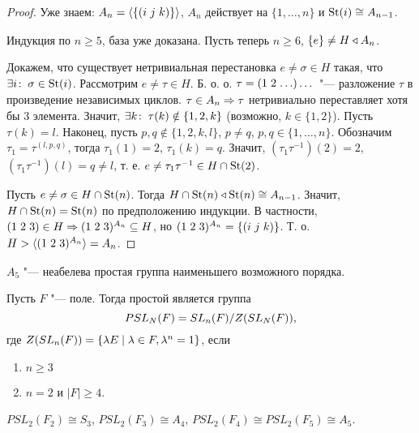 \documentclass[main]{subfiles}
\begin{document}
\begin{proof}
  Уже знаем: \( A_n = \GenGroup{ \{ \Cycle{i & j & k} \} } \),
  \( A_n \) действует на \( \{ 1, \dots, n \} \)
  и \( \operatorname{St}(i) \cong A_{n - 1} \).

  Индукция по $n \ge 5$, база уже доказана.
  Пусть теперь $n \ge 6$, $\{ e \} \ne H \triangleleft A_n$.

  Докажем, что существует нетривиальная
  перестановка \( e \ne \sigma \in H \) такая,
  что \( \exists i \colon \: \sigma \in \operatorname{St}(i) \).
  Рассмотрим $e \ne \tau \in H$. Б. о. о.
  $\tau = \Cycle{1 & 2 & \dots}\dots$ "--- разложение $\tau$ в произведение
  независимых циклов. $\tau \in A_n \Rightarrow \tau$ нетривиально переставляет
  хотя бы $3$ элемента.
  Значит, $\exists k \colon \: \tau(k) \notin \{ 1, 2, k \}$
  (возможно, $k \in \{ 1 ,2 \}$).
  Пусть $\tau(k) = l$. Наконец,
  пусть $p, q \notin \{ 1, 2, k, l \}$, $p \ne q$, $p, q \in \{1, \dots, n \}$.
  Обозначим $\tau_1 = \tau^{(l,p,q)}$,
  тогда $\tau_1(1) = 2$, $\tau_1(k) = q$.
  Значит,
  $(\tau_1 \tau^{-1})(2) = 2$,
  $(\tau_1 \tau^{-1})(l) = q \ne l$,
  т. е.  $e \ne \tau_1 \tau^{-1} \in H \cap \operatorname{St}(2)$.

  Пусть $e \ne \sigma \in H \cap \operatorname{St}(n)$. Тогда $H \cap \operatorname{St}(n)
  \triangleleft \operatorname{St}(n) \cong A_{n - 1}$. Значит,
  $H \cap \operatorname{St}(n) = \operatorname{St}(n)$ по предположению индукции.
  В частности, $\Cycle{1&2&3} \in H \To \Cycle{1&2&3}^{A_n} \subseteq H$,
  но $\Cycle{1&2&3}^{A_n} = \{ \Cycle{i&j&k} \}$. Т. о. $H > \langle
  \Cycle{1&2&3}^{A_n} \rangle = A_n$.
\end{proof}

\begin{remark}
  $A_5$ "--- неабелева простая группа наименьшего возможного порядка.
\end{remark}

\begin{remark}
  Пусть $F$ "--- поле.
  Тогда простой является группа
  \[
    PSL_N(F) = \Factor{SL_n(F)}[\Centre{SL_N(F)}],
  \]
  где $Z(SL_n(F)) =
  \{ \lambda E \mid \lambda \in F, \lambda^n = 1 \}$,
  если
  \begin{enumerate}\renewcommand{\labelenumi}{\asbuk{enumi})}
    \item $n \ge 3$ 
    \item $n = 2$ и $|F| \ge 4$.
  \end{enumerate}
\end{remark}

\begin{exercise}
  $PSL_2(F_2) \cong S_3$,
  $PSL_2(F_3) \cong A_4$,
  $PSL_2(F_4) \cong PSL_2(F_5) \cong A_5$.
\end{exercise}
\end{document}
